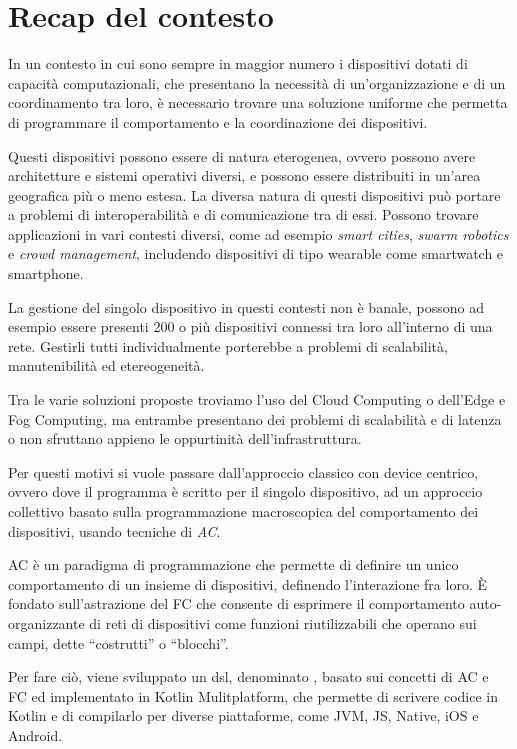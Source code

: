 \section{Recap del contesto}
\label{sec:context}
In un contesto in cui sono sempre in maggior numero i dispositivi dotati di capacità computazionali,
che presentano la necessità di un'organizzazione e di un coordinamento tra loro,
è necessario trovare una soluzione uniforme che permetta di programmare il comportamento e la coordinazione dei dispositivi.

Questi dispositivi possono essere di natura eterogenea, ovvero possono avere architetture e sistemi operativi diversi,
e possono essere distribuiti in un'area geografica più o meno estesa.
%
La diversa natura di questi dispositivi può portare a problemi di interoperabilità e di comunicazione tra di essi.
%
Possono trovare applicazioni in vari contesti diversi, come ad esempio \emph{smart cities}, \emph{swarm robotics} e \emph{crowd management},
includendo dispositivi di tipo wearable come smartwatch e smartphone.

La gestione del singolo dispositivo in questi contesti non è banale, possono ad esempio essere presenti 200 o più dispositivi
    connessi tra loro all'interno di una rete.
%
Gestirli tutti individualmente porterebbe a problemi di scalabilità, manutenibilità ed etereogeneità.

Tra le varie soluzioni proposte troviamo l'uso del Cloud Computing o dell'Edge e Fog Computing,
    ma entrambe presentano dei problemi di scalabilità e di latenza o non sfruttano appieno le oppurtinità dell'infrastruttura.

Per questi motivi si vuole passare dall'approccio classico con device centrico, ovvero dove il programma è scritto per il singolo dispositivo,
    ad un approccio collettivo basato sulla programmazione macroscopica del comportamento dei dispositivi,
    usando tecniche di \emph{\ac{AC}}.

\ac{AC} è un paradigma di programmazione che permette di definire un unico comportamento di un insieme di dispositivi,
    definendo l'interazione fra loro.
%
È fondato sull'astrazione del \ac{FC} che consente di esprimere il comportamento auto-organizzante di reti
    di dispositivi come funzioni riutilizzabili che operano sui campi, dette ``costrutti'' o ``blocchi''.

Per fare ciò, viene sviluppato un \ac{dsl}, denominato \ck{}, basato sui concetti di \ac{AC} e \ac{FC} ed implementato in Kotlin Mulitplatform,
    che permette di scrivere codice in Kotlin e di compilarlo per diverse piattaforme, come JVM, JS, Native, iOS e Android.

